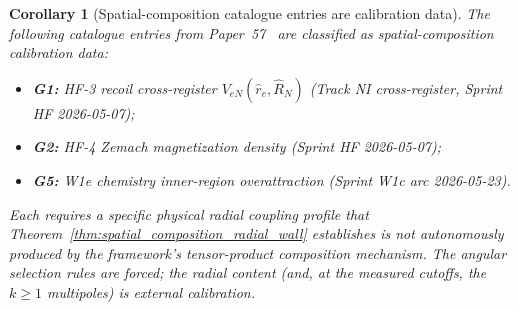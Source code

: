 \documentclass[11pt]{article}
\newtheorem{corollary}{Corollary}
\begin{document}
\begin{corollary}[Spatial-composition catalogue entries are calibration data]
\label{cor:spatial_composition_wall}
The following catalogue entries from Paper~57~\cite{paper57} are
classified as spatial-composition calibration data:
\begin{itemize}\setlength{\itemsep}{1pt}
\item \textbf{G1:} HF-3 recoil cross-register
  $V_{eN}(\hat r_e, \hat R_N)$ (Track NI cross-register, Sprint HF
  2026-05-07);
\item \textbf{G2:} HF-4 Zemach magnetization density (Sprint HF
  2026-05-07);
\item \textbf{G5:} W1e chemistry inner-region overattraction (Sprint
  W1c arc 2026-05-23).
\end{itemize}
Each requires a specific physical radial coupling profile that
Theorem~\ref{thm:spatial_composition_radial_wall} establishes is not
autonomously produced by the framework's tensor-product composition
mechanism.  The angular selection rules are forced; the radial content
(and, at the measured cutoffs, the $k \ge 1$ multipoles) is external
calibration.
\end{corollary}
\end{document}
